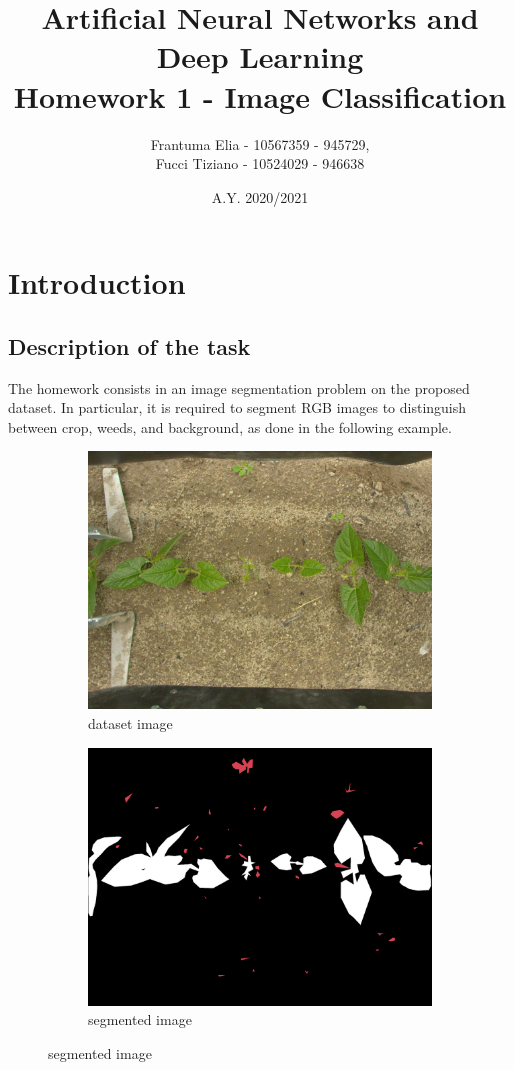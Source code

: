 \documentclass[12pt,a4paper]{report}
\title{Artificial Neural Networks and Deep Learning \\ Homework 1 - Image Classification}
\author{Frantuma Elia - 10567359 - 945729, \\
		Fucci Tiziano - 10524029 - 946638}
\date{A.Y. 2020/2021}
\begin{document}
	\maketitle
	\tableofcontents
	\chapter{Introduction}
		\section{Description of the task}
			The homework consists in an image segmentation problem on the proposed dataset. In particular, it is required to segment RGB images to distinguish between crop, weeds, and background, as done in the following example.

\begin{figure}[H]
\renewcommand*\thesubfigure{\arabic{subfigure}} 
\centering
\begin{subfigure}{.45\textwidth}
  \centering
  \includegraphics[width=1\linewidth]{image0}
  \caption{dataset image}
  \label{fig:sub1}
\end{subfigure}
\begin{subfigure}{.45\textwidth}
  \centering
  \includegraphics[width=1\linewidth]{image1}
  \caption{segmented image}
  \label{fig:sub2}
\end{subfigure}
\end{figure}
\end{document}
